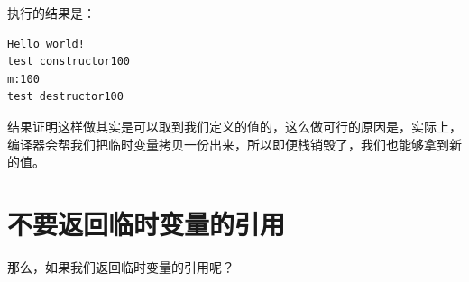 \documentclass[12pt]{article}
\begin{document}
\begin{Shaded}
\begin{Highlighting}[]
\OperatorTok{\{}
\OperatorTok{:}
\OperatorTok{(}\OperatorTok{)} \OperatorTok{\{}
\OperatorTok{(}\OperatorTok{);}
        \OperatorTok{;}
    \OperatorTok{\}}
\OperatorTok{\};}

\OperatorTok{(}\OperatorTok{,} \OperatorTok{*}\OperatorTok{[])} \OperatorTok{\{}
    \OperatorTok{\textless{}\textless{}}  \OperatorTok{\textless{}\textless{}} \OperatorTok{;}
\OperatorTok{;}
\OperatorTok{=}\OperatorTok{(}\OperatorTok{);}
\OperatorTok{();}
     \OperatorTok{;}
\OperatorTok{\}}
\end{Highlighting}
\end{Shaded}

执行的结果是：

\begin{verbatim}
Hello world!
test constructor100
m:100
test destructor100
\end{verbatim}

结果证明这样做其实是可以取到我们定义的值的，这么做可行的原因是，实际上，编译器会帮我们把临时变量拷贝一份出来，所以即便栈销毁了，我们也能够拿到新的值。

\section{不要返回临时变量的引用}\label{ux4e0dux8981ux8fd4ux56deux4e34ux65f6ux53d8ux91cfux7684ux5f15ux7528}

那么，如果我们返回临时变量的引用呢？

\begin{Shaded}
\begin{Highlighting}[]
\OperatorTok{\{}
\OperatorTok{:}
\OperatorTok{*}\OperatorTok{(}\OperatorTok{)\{}
\OperatorTok{(}\OperatorTok{);}
         \OperatorTok{\&}\OperatorTok{;}
    \OperatorTok{\}}
\OperatorTok{\};}
\end{Highlighting}
\end{Shaded}
\end{document}
